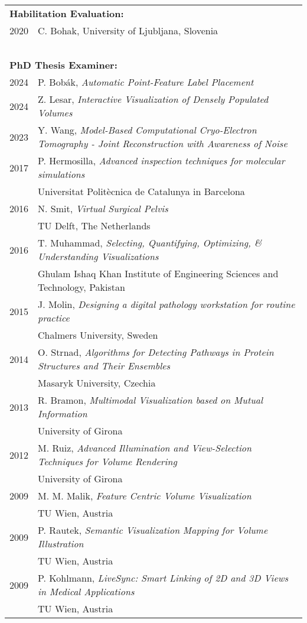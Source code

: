 \documentclass[a4paper,11pt]{letter}
\begin{document}
\begin{tabular}{l| l}
\multicolumn{2}{l}{\textbf{Habilitation Evaluation:}} \\
2020 & C. Bohak, University of Ljubljana, Slovenia \\
\hline
\multicolumn{2}{l}{~} \\
\multicolumn{2}{l}{\textbf{PhD Thesis Examiner:}} \\
2024 & P. Bob{\'a}k, \emph{Automatic Point-Feature Label Placement} \\
2024 & Z. Lesar, \emph{Interactive Visualization of Densely Populated Volumes}\\
2023  & Y. Wang, \emph{Model-Based Computational Cryo-Electron Tomography - Joint Reconstruction with Awareness of Noise} \\
2017 & P. Hermosilla, \emph{Advanced inspection techniques for molecular simulations} \\
 & Universitat Politècnica de Catalunya in Barcelona \\
2016 & N. Smit, \emph{Virtual Surgical Pelvis} \\
 & TU Delft, The Netherlands \\
2016 & T. Muhammad, \emph{Selecting, Quantifying, Optimizing, \& Understanding Visualizations} \\
 & Ghulam Ishaq Khan Institute of Engineering Sciences and Technology, Pakistan \\
2015 & J. Molin, \emph{Designing a digital pathology workstation for routine practice} \\
 & Chalmers University, Sweden \\
2014 & O. Strnad, \emph{Algorithms for Detecting Pathways in Protein Structures and Their Ensembles} \\
 & Masaryk University, Czechia \\
2013 & R. Bramon, \emph{Multimodal Visualization based on Mutual Information} \\
 & University of Girona \\
2012 & M. Ruiz, \emph{Advanced Illumination and View-Selection Techniques for Volume Rendering} \\
 & University of Girona \\
2009 &  M. M. Malik, \emph{Feature Centric Volume Visualization} \\
 & TU Wien, Austria \\
2009 & P. Rautek, \emph{Semantic Visualization Mapping for Volume Illustration} \\
 & TU Wien, Austria \\
2009 & P. Kohlmann, \emph{LiveSync: Smart Linking of 2D and 3D Views in Medical Applications} \\
 & TU Wien, Austria \\
\end{tabular}
\end{document}
